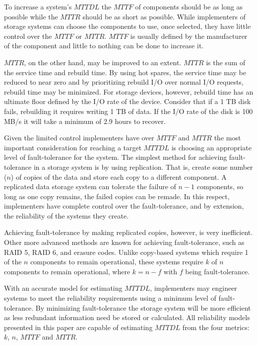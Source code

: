 \documentclass[XXX,endnotes]{usetex-v1}
\begin{document}
To increase a system's $MTTDL$ the $MTTF$ of components should be as long as possible while the $MTTR$ should be as short as possible.  While implementers of storage systems can choose the components to use, once selected, they have little control over the $MTTF$ or $MTTR$.  $MTTF$ is usually defined by the manufacturer of the component and little to nothing can be done to increase it.

$MTTR$, on the other hand, may be improved to an extent.  $MTTR$ is the sum of the service time and rebuild time.  By using hot spares, the service time may be reduced to near zero and by prioritizing rebuild I/O over normal I/O requests, rebuild time may be minimized.  For storage devices, however, rebuild time has an ultimate floor defined by the I/O rate of the device.  Consider that if a 1 TB disk fails, rebuilding it requires writing 1 TB of data.  If the I/O rate of the disk is 100 MB/s it will take a minimum of 2.9 hours to recover.

Given the limited control implementers have over $MTTF$ and $MTTR$ the most important consideration for reaching a target $MTTDL$ is choosing an appropriate level of fault-tolerance for the system.  The simplest method for achieving fault-tolerance in a storage system is by using replication.  That is, create some number ($n$) of copies of the data and store each copy to a different component.  A replicated data storage system can tolerate the failure of $n-1$ components, so long as one copy remains, the failed copies can be remade.  In this respect, implementers have complete control over the fault-tolerance, and by extension, the reliability of the systems they create.

Achieving fault-tolerance by making replicated copies, however, is very inefficient.  Other more advanced methods are known for achieving fault-tolerance, such as RAID 5, RAID 6, and erasure codes.  Unlike copy-based systems which require 1 of the $n$ components to remain operational, these systems require $k$ of $n$ components to remain operational, where $k = n - f$ with $f$ being fault-tolerance.

With an accurate model for estimating $MTTDL$, implementers may engineer systems to meet the reliability requirements using a minimum level of fault-tolerance.  By minimizing fault-tolerance the storage system will be more efficient as less redundant information need be stored or calculated.  All reliability models presented in this paper are capable of estimating $MTTDL$ from the four metrics: $k$, $n$, $MTTF$ and $MTTR$.
\end{document}
